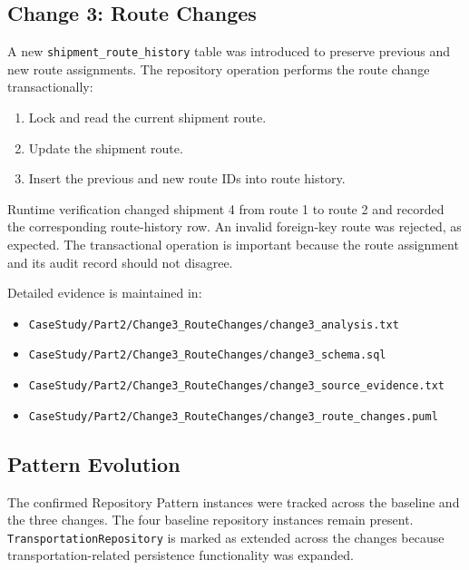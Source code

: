 \documentclass[12pt,a4paper]{article}
\begin{document}
\subsection{Change 3: Route Changes}
A new \texttt{shipment\_route\_history} table was introduced to preserve previous and new route assignments. The repository operation performs the route change transactionally:
\begin{enumerate}
    \item Lock and read the current shipment route.
    \item Update the shipment route.
    \item Insert the previous and new route IDs into route history.
\end{enumerate}

Runtime verification changed shipment 4 from route 1 to route 2 and recorded the corresponding route-history row. An invalid foreign-key route was rejected, as expected. The transactional operation is important because the route assignment and its audit record should not disagree.

Detailed evidence is maintained in:
\begin{itemize}
    \item \texttt{CaseStudy/Part2/Change3\_RouteChanges/change3\_analysis.txt}
    \item \texttt{CaseStudy/Part2/Change3\_RouteChanges/change3\_schema.sql}
    \item \texttt{CaseStudy/Part2/Change3\_RouteChanges/change3\_source\_evidence.txt}
    \item \texttt{CaseStudy/Part2/Change3\_RouteChanges/change3\_route\_changes.puml}
\end{itemize}

\subsection{Pattern Evolution}
The confirmed Repository Pattern instances were tracked across the baseline and the three changes. The four baseline repository instances remain present. \texttt{TransportationRepository} is marked as extended across the changes because transportation-related persistence functionality was expanded.
\end{document}
